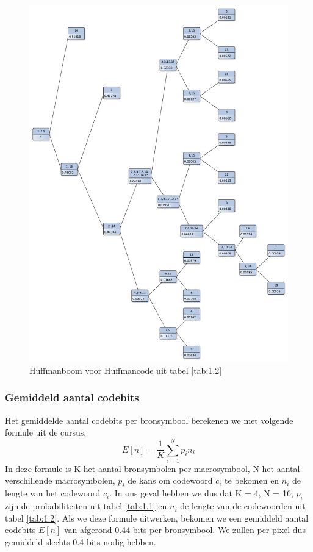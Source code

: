 \documentclass[11pt,a4paper]{article}
\begin{document}
\begin{figure}[h!]
  		\centering
   		\includegraphics[width=1.1\textwidth]{1_1_huffman_tree.pdf}
  	  	\caption{Huffmanboom voor Huffmancode uit tabel \ref{tab:1.2}}
  		\label{fig:1.huff}
\end{figure}

\subsubsection{Gemiddeld aantal codebits}

Het gemiddelde aantal codebits per bronsymbool berekenen we met volgende formule uit de cursus.
\begin{equation}
E[n]=\frac{1}{K} \sum_{i=1}^{N} p_i n_i
\end{equation}
In deze formule is K het aantal bronsymbolen per macrosymbool, N het aantal verschillende macrosymbolen, $p_i$ de kans om codewoord $c_i$ te bekomen en $n_i$ de lengte van het codewoord $c_i$. In ons geval hebben we dus dat K = 4, N = 16, $p_i$ zijn de probabiliteiten uit tabel \ref{tab:1.1} en $n_i$ de lengte van de codewoorden uit tabel \ref{tab:1.2}. Als we deze formule uitwerken, bekomen we een gemiddeld aantal codebits $E[n]$ van afgerond 0.44 bits per bronsymbool. We zullen per pixel dus gemiddeld slechts 0.4 bits nodig hebben.
\end{document}
